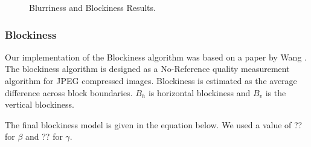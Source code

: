 \begin{figure} [H]
	\centering
	\caption{Blurriness and Blockiness Results.} \label{fig:BlurrBlockExp}	
\end{figure}

\subsubsection{Blockiness}

Our implementation of the Blockiness algorithm was based on a paper by Wang \cite{Wang}.  
The blockiness algorithm is designed as a No-Reference quality measurement algorithm for JPEG compressed images.  
Blockiness is estimated as the average difference across block boundaries.  
$B_{h}$ is horizontal blockiness and $B_{v}$ is the vertical blockiness.






The final blockiness model is given in the equation below.  We used a value of ?? for $\beta$ and ?? for $\gamma$.
















